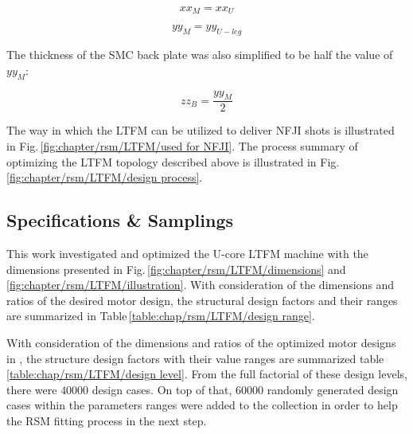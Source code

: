         
        \begin{equation}
            xx_M=xx_U
            \label{eq:chap/rsm/LTFM/xm is xu}
        \end{equation}
        
        
        \begin{equation}
            yy_M=yy_{U-leg}
            \label{eq:chap/rsm/LTFM/ym is yuleg}
        \end{equation}
        
        
        The thickness of the \acs{SMC} back plate was also simplified to be half the value of $yy_{M}$:
        
        
        \begin{equation}
            zz_B=\frac{yy_M}{2}
            \label{eq:chap/rsm/LTFM/zb is half of ym}
        \end{equation}
        
        
        The way in which the \acs{LTFM} can be utilized to deliver \acs{NFJI} shots is illustrated in Fig.\,\ref{fig:chapter/rsm/LTFM/used for NFJI}. The process summary of optimizing the \acs{LTFM} topology described above is illustrated in Fig.\,\ref{fig:chapter/rsm/LTFM/design process}.
        

        \subsection{Specifications \& Samplings}    \label{Chapter:RSM/LTFM/spec}
        
            
            This work investigated and optimized the U-core \acs{LTFM} machine with the dimensions presented in Fig.\,\ref{fig:chapter/rsm/LTFM/dimensions} and \ref{fig:chapter/rsm/LTFM/illustration}. With consideration of the dimensions and ratios of the desired motor design, the structural design factors and their ranges are summarized in Table\,\ref{table:chap/rsm/LTFM/design range}. 
            
            
            With consideration of the dimensions and ratios of the optimized motor designs in \cite{Kremers2015}, the structure design factors with their value ranges are summarized table\,\ref{table:chap/rsm/LTFM/design level}. From the full factorial of these design levels, there were $40000$ design cases. On top of that, $60000$ randomly generated design cases within the parameters ranges were added to the collection in order to help the \acs{RSM} fitting process in the next step.
            
